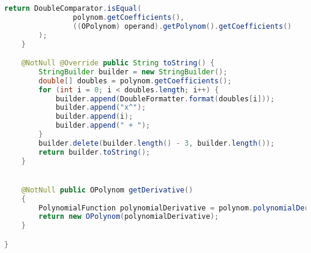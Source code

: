 \begin{lstlisting}[caption=OPolynom (Meinerzhagen),label=list:OPolynom,language=Java]
        return DoubleComparator.isEqual(
                polynom.getCoefficients(),
                ((OPolynom) operand).getPolynom().getCoefficients()
        );
    }

    @NotNull @Override public String toString() {
        StringBuilder builder = new StringBuilder();
        double[] doubles = polynom.getCoefficients();
        for (int i = 0; i < doubles.length; i++) {
            builder.append(DoubleFormatter.format(doubles[i]));
            builder.append("x^");
            builder.append(i);
            builder.append(" + ");
        }
        builder.delete(builder.length() - 3, builder.length());
        return builder.toString();
    }


    @NotNull public OPolynom getDerivative()
    {
        PolynomialFunction polynomialDerivative = polynom.polynomialDerivative();
        return new OPolynom(polynomialDerivative);
    }

}
\end{lstlisting}    

